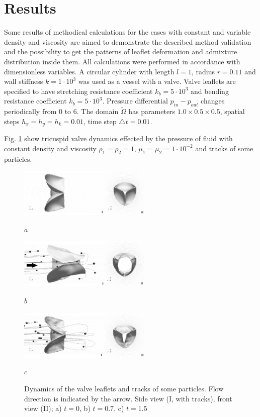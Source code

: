 \documentclass[conference]{IEEEtran}
\begin{document}
\section{Results}
Some results of methodical calculations for the cases with constant and variable 
density and viscosity are aimed to demonstrate the described method validation 
and the possibility to get the patterns of leaflet deformation and admixture 
distribution inside them. All calculations were performed in accordance with 
dimensionless variables. A circular cylinder with length $l = 1$, radius $r = 0.11$
and wall stiffness $k = 1 \cdot 10^3$ was used as a vessel with a valve.
Valve leaflets are specified to have stretching resistance coefficient
$k_b = 5 \cdot 10^3$ and bending resistance coefficient $k_b = 5 \cdot 10^3$.
Pressure differential $p_{in} - p_{out}$ changes periodically from 0 to 6.
The domain $\tilde{\Omega}$ has parameters $1.0 \times 0.5 \times 0.5$,
spatial steps $h_x = h_y = h_k = 0.01$, time step $\triangle t = 0.01$.

Fig. \ref{fig:valve} show tricuspid valve dynamics effected by the pressure of fluid with constant density and viscosity $\rho_1 = \rho_2 = 1$, $\mu_1 = \mu_2 = 1 \cdot 10^{-2}$ and tracks of some particles.


\begin{figure}[!t]
\centering
\includegraphics[width=2.5in]{images/valve_delaunay_with_markers_grayscale1.png}

$a$

\includegraphics[width=2.5in]{images/valve_delaunay_with_markers_grayscale2.png}

$b$

\includegraphics[width=2.5in]{images/valve_delaunay_with_markers_grayscale3.png}

$c$

\caption{Dynamics of the valve leaflets and tracks of some particles. Flow direction  is indicated by the arrow.
Side view (I, with tracks), front view (II);
a) $t=0$, b) $t=0.7$, c) $t=1.5$}
\label{fig:valve}
\end{figure}
\end{document}
